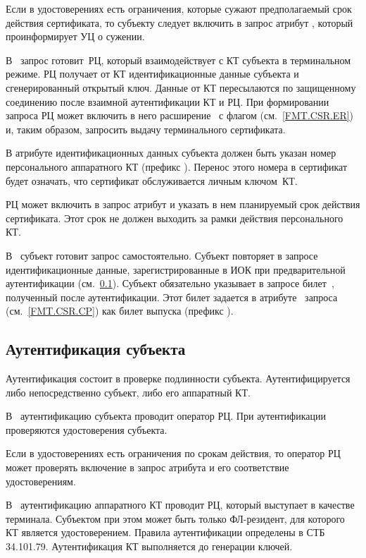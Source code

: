 Если в удостоверениях есть ограничения, которые сужают предполагаемый срок
действия сертификата, то субъекту следует включить в запрос атрибут
, который проинформирует УЦ о сужении.

В~ запрос готовит~РЦ, который взаимодействует с КТ субъекта в
терминальном режиме. РЦ получает от КТ идентификационные данные субъекта и
сгенерированный открытый ключ. Данные от КТ пересылаются по защищенному
соединению после взаимной аутентификации КТ и РЦ.
%
При формировании запроса РЦ может включить в него расширение~
с флагом  (см.~\ref{FMT.CSR.ER}) и, таким образом,
запросить выдачу терминального сертификата.

В атрибуте  идентификационных данных субъекта должен быть
указан номер персонального аппаратного КТ (префикс ). Перенос этого 
номера в сертификат будет означать, что сертификат обслуживается личным 
ключом~КТ.

РЦ может включить в запрос атрибут  и указать в нем
планируемый срок действия сертификата. Этот срок не должен выходить за рамки
действия персонального КТ.

В~ субъект готовит запрос самостоятельно. Субъект повторяет в
запросе идентификационные данные, зарегистрированные в ИОК при предварительной
аутентификации (см.~\ref{PROCESSES.Enroll.Auth}).
%
Субъект обязательно указывает в запросе билет~, полученный после
аутентификации. Этот билет задается в атрибуте~ запроса
(см.~\ref{FMT.CSR.CP}) как билет выпуска (префикс ).

\subsection{Аутентификация субъекта}\label{PROCESSES.Enroll.Auth}

Аутентификация состоит в проверке подлинности субъекта. Аутентифицируется либо
непосредственно субъект, либо его аппаратный КТ.

В~ аутентификацию субъекта проводит оператор РЦ. При
аутентификации проверяются удостоверения субъекта.

Если в удостоверениях есть ограничения по срокам действия, то оператор РЦ
может проверять включение в запрос атрибута  и его 
соответствие удостоверениям.

В~ аутентификацию аппаратного КТ проводит РЦ, который выступает в
качестве терминала. Субъектом при этом может быть только ФЛ-резидент, для
которого КТ является удостоверением. Правила аутентификации определены в СТБ
34.101.79. Аутентификация КТ выполняется до генерации ключей.

